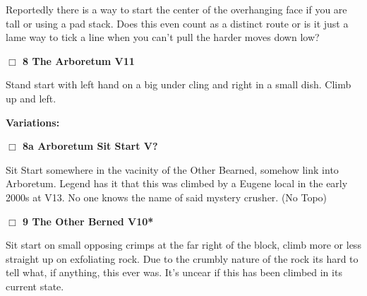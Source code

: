 \begin{multicols}{2}
\begin{adjustwidth}{1.3em}{}
Reportedly there is a way to start the center of the overhanging face if you are tall or using a pad stack. Does this even count as a distinct route or is it just a lame way to tick a line when you can't pull the harder moves down low?
\end{adjustwidth}




\needspace{2em}
\label{rt:The Arboretum}
\colorbox{red!20}{
\parbox{0.95\linewidth}{
\hspace{-1ex}\textbf{$\Box$
8 The Arboretum V11  
}}}
\begin{adjustwidth}{1.3em}{}			

Stand start with left hand on a big under cling and right in a small dish. Climb up and left.
\end{adjustwidth}


\begin{adjustwidth}{0.5cm}{}				
\needspace{4em}
\textbf{Variations:} \newline

\needspace{2em}
\label{vr:Arboretum Sit Start}
\colorbox{black!20}{
\parbox{0.95\linewidth}{
\hspace{-1ex}\textbf{$\Box$
8a Arboretum Sit Start V?  
}}}
\begin{adjustwidth}{1.3em}{}			

Sit Start somewhere in the vacinity of the Other Bearned, somehow link into Arboretum. Legend has it that this was climbed by a Eugene local in the early 2000s at V13. No one knows the name of said mystery crusher.
  (No Topo)
\end{adjustwidth}



\end{adjustwidth}


\needspace{2em}
\label{rt:The Other Berned}
\colorbox{red!20}{
\parbox{0.95\linewidth}{
\hspace{-1ex}\textbf{$\Box$
9 The Other Berned V10*  
}}}
\begin{adjustwidth}{1.3em}{}			

Sit start on small opposing crimps at the far right of the block, climb more or less straight up on exfoliating rock. Due to the crumbly nature of the rock its hard to tell what, if anything, this ever was. It's uncear if this has been climbed in its current state.
\end{adjustwidth}




\label{tp:Gumby Wall}
	\end{multicols}
